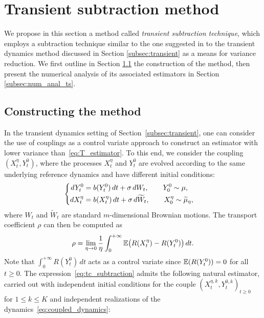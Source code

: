 \section{Transient subtraction method}
\label{sec:transient}
%
We propose in this section a method called \emph{transient subtraction technique}, which employs a subtraction technique similar to the one suggested in \cite{ciccotti1975} to the transient dynamics method discussed in Section \ref{subsec:transient} as a means for variance reduction. We first outline in Section \ref{subsec:constructing_method} the construction of the method, then present the numerical analysis of its associated estimators in Section \ref{subsec:num_anal_ts}.

\subsection{Constructing the method}
\label{subsec:constructing_method}
%
In the transient dynamics setting of Section~\ref{subsec:transient}, one can consider the use of couplings as a control variate approach to construct an estimator with lower variance than~\eqref{eq:T_estimator}. To this end, we consider the coupling $(X_t^\eta,Y_t^0)$, where the processes $X_t^\eta$ and $Y_t^0$ are evolved according to the same underlying reference dynamics and have different initial conditions:
%
\begin{equation}
\begin{cases}
\begin{aligned}
	dY_t^0 &= b(Y_t^0) \, dt + \sigma \, dW_t, \qquad Y_0^0 \sim \mu, \\
	dX_t^\eta &= b(X_t^\eta) \, dt + \sigma \, d\widetilde{W}_t, \qquad X_0^\eta \sim \widetilde{\mu}_\eta,
\end{aligned}
\end{cases}
\label{eq:coupled_dynamics}
\end{equation}
%
where $W_t$ and $\widetilde{W}_t$ are standard $m$-dimensional Brownian motions. The transport coefficient $\rho$ can then be computed as
%
\begin{equation}
	\rho = \lim_{\eta\to 0} \frac{1}{\eta}\int_0^{+\infty} \E\paren*{R(X_t^\eta) - R(Y_t^0)}\,  dt.
	\label{eq:tc_subtraction}
\end{equation}
%
Note that $\int_0^{+\infty} R(Y_t^0) \, dt$ acts as a control variate since $\mathbb{E}(R(Y_t^0))=0$ for all $t\geq 0$. The expression~\eqref{eq:tc_subtraction} admits the following natural estimator, carried out with independent initial conditions for the couple $(X_t^{\eta,k},Y_t^{0,k})_{t\geq 0}$ for $1\leq k\leq K$ and independent realizations of the dynamics~\eqref{eq:coupled_dynamics}:
